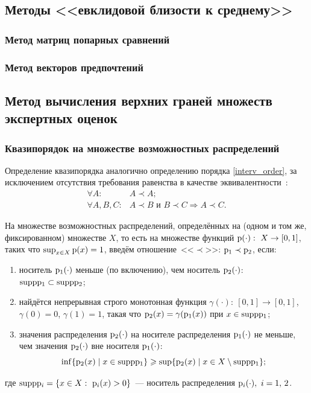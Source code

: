 \subsection{Методы <<евклидовой близости к среднему>>}


	
\subsubsection{Метод матриц попарных сравнений}


\subsubsection{Метод векторов предпочтений}


\subsection{Метод вычисления верхних граней множеств экспертных оценок}

\subsubsection{Квазипорядок на множестве возможностных распределений}
\label{preorder_pyt}

Определение квазипорядка аналогично определению порядка \eqref{interv_order}, за исключением отсутствия требования равенства в качестве эквивалентности~\cite{Mirkin}: 
 \begin{equation}
\label{preoder_def}
\begin{split}
\forall A: & A \prec A; \\
\forall A, B, C: & A \prec B \text{ и } B \prec C \Rightarrow A \prec C.
\end{split}
\end{equation}

На множестве возможностных распределений, определённых на (одном и том же, фиксированном) множестве $X$, то есть на множестве функций $\p(\cdot):\ X\to[0,1]$, таких что $\sup_{x\in X} {\mathrm{p}}(x) = 1$, введём отношение~<<$\prec$>>: ${\mathrm{p}}_1\prec{\mathrm{p}}_2$, если:
\begin{enumerate}
    \item\label{order-D1}
        носитель ${\mathrm{p}}_1(\cdot)$ меньше (по включению), чем носитель ${\mathrm{p}}_2(\cdot)$: ${\mathrm{supp}}{\mathrm{p}}_1\subset{\mathrm{supp}}{\mathrm{p}}_2$;
    \item\label{order-D2}
        найдётся непрерывная строго монотонная функция ${\gamma(\cdot):\ [0,1]\to[0,1]}$, $\gamma(0) = 0$, $\gamma(1) = 1$, такая что ${\mathrm{p}}_2(x) = \gamma({\mathrm{p}}_1(x))$ при $x\in{\mathrm{supp}}{\mathrm{p}}_1$;
    \item\label{order-D3}
        значения распределения ${\mathrm{p}}_2(\cdot)$ на носителе распределения ${\mathrm{p}}_1(\cdot)$ не меньше, чем значения ${\mathrm{p}}_2(\cdot)$ вне носителя ${\mathrm{p}}_1(\cdot)$:
        $$\inf\{{\mathrm{p}}_2(x) \mid x\in{\mathrm{supp}}{\mathrm{p}}_1\} \geqslant \sup\{{\mathrm{p}}_2(x) \mid x\in X\setminus{\mathrm{supp}}{\mathrm{p}}_1\};$$
\end{enumerate}
где ${\mathrm{supp}} {\mathrm{p}}_i = \{x\in X:\ {\mathrm{p}}_i(x) > 0\}$~--- носитель распределения ${\mathrm{p}}_i(\cdot),\ i=1,\, 2$.

